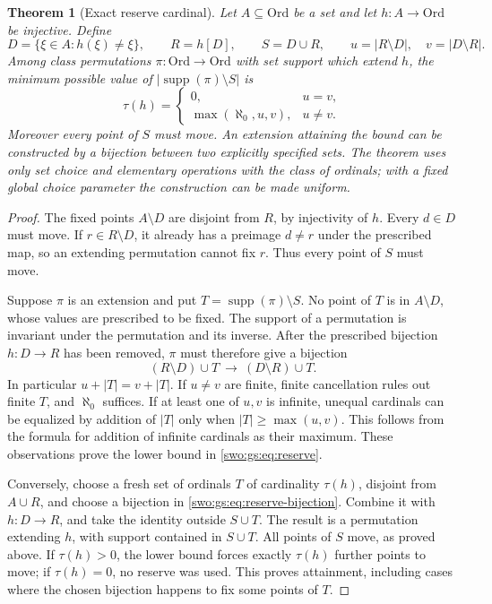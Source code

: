 \documentclass[11pt]{article}
\newtheorem{theorem}{Theorem}[section]
\theoremstyle{definition}
\theoremstyle{remark}
\newcommand{\Ord}{\mathrm{Ord}}
\newcommand{\supp}{\operatorname{supp}}
\begin{document}
\begin{theorem}[Exact reserve cardinal]\label{swo:gs:thm:reserve}
Let $A\subseteq\Ord$ be a set and let $h:A\to\Ord$ be injective. Define
\[
 D=\{\xi\in A:h(\xi)\ne\xi\},\qquad R=h[D],\qquad S=D\cup R,
 \qquad u=|R\setminus D|,\quad v=|D\setminus R|.
\]
Among class permutations $\pi:\Ord\to\Ord$ with set support which extend
$h$, the minimum possible value of $|\supp(\pi)\setminus S|$ is
\[\tag{S17.6}\label{swo:gs:eq:reserve}
 \boxed{\tau(h)=
 \begin{cases}
 0,&u=v,\\
 \max(\aleph_0,u,v),&u\ne v.
 \end{cases}}
\]
Moreover every point of $S$ must move. An extension attaining the bound
can be constructed by a bijection between two explicitly specified sets.
The theorem uses only set choice and elementary operations with the class
of ordinals; with a fixed global choice parameter the construction can be
made uniform.
\end{theorem}
\begin{proof}
The fixed points $A\setminus D$ are disjoint from $R$, by injectivity of
$h$. Every $d\in D$ must move. If $r\in R\setminus D$, it already has a
preimage $d\ne r$ under the prescribed map, so an extending permutation
cannot fix $r$. Thus every point of $S$ must move.

Suppose $\pi$ is an extension and put $T=\supp(\pi)\setminus S$. No point
of $T$ is in $A\setminus D$, whose values are prescribed to be fixed.
The support of a permutation is invariant under the permutation and its
inverse. After the prescribed bijection $h:D\to R$ has been removed,
$\pi$ must therefore give a bijection
\[\tag{S17.7}\label{swo:gs:eq:reserve-bijection}
 (R\setminus D)\cup T\ \longrightarrow\ (D\setminus R)\cup T.
\]
In particular $u+|T|=v+|T|$. If $u\ne v$ are finite, finite cancellation
rules out finite $T$, and $\aleph_0$ suffices. If at least one of $u,v$
is infinite, unequal cardinals can be equalized by addition of $|T|$
only when $|T|\ge\max(u,v)$. This follows from the formula for addition
of infinite cardinals as their maximum. These observations prove the
lower bound in \eqref{swo:gs:eq:reserve}.

Conversely, choose a fresh set of ordinals $T$ of cardinality $\tau(h)$,
disjoint from $A\cup R$, and choose a bijection in
\eqref{swo:gs:eq:reserve-bijection}. Combine it with $h:D\to R$, and take the
identity outside $S\cup T$. The result is a permutation extending $h$,
with support contained in $S\cup T$. All points of $S$ move, as proved
above. If $\tau(h)>0$, the lower bound forces exactly $\tau(h)$ further
points to move; if $\tau(h)=0$, no reserve was used. This proves
attainment, including cases where the chosen bijection happens to fix
some points of $T$.
\end{proof}
\end{document}
